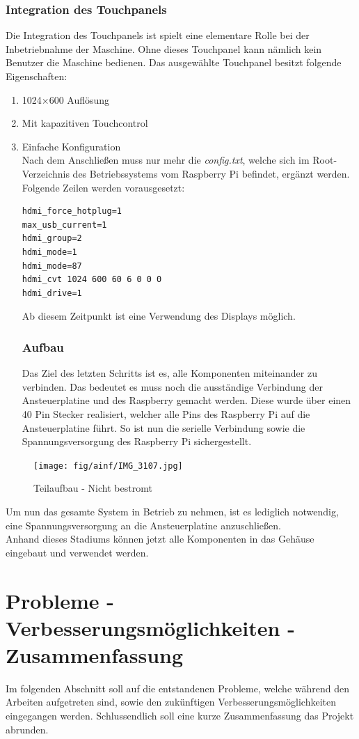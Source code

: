 \subsubsection{Integration des Touchpanels}
Die Integration des Touchpanels ist spielt eine elementare Rolle bei der Inbetriebnahme der Maschine.
Ohne dieses Touchpanel kann nämlich kein Benutzer die Maschine bedienen.
Das ausgewählte Touchpanel besitzt folgende Eigenschaften:
\begin{enumerate}
\item  1024×600 Auflösung
\item Mit kapazitiven Touchcontrol
\item Einfache Konfiguration\\
Nach dem Anschließen muss nur mehr die \textit{config.txt}, welche sich im Root-Verzeichnis des Betriebssystems vom Raspberry Pi befindet, ergänzt werden.
Folgende Zeilen werden vorausgesetzt:
\begin{lstlisting}[style=java,caption=Display-Parameter,label=resource]
hdmi_force_hotplug=1
max_usb_current=1
hdmi_group=2
hdmi_mode=1
hdmi_mode=87
hdmi_cvt 1024 600 60 6 0 0 0
hdmi_drive=1
\end{lstlisting}
Ab diesem Zeitpunkt ist eine Verwendung des Displays möglich.
\subsubsection{Aufbau}
Das Ziel des letzten Schritts ist es, alle Komponenten miteinander zu verbinden.
Das bedeutet es muss noch die ausständige Verbindung der Ansteuerplatine und des Raspberry gemacht werden.
Diese wurde über einen 40 Pin Stecker realisiert, welcher alle Pins des Raspberry Pi auf die Ansteuerplatine führt.
So ist nun die serielle Verbindung sowie die Spannungsversorgung des Raspberry Pi sichergestellt.
\end{enumerate}
\begin{figure}[H]
\centering
\texttt{[image: fig/ainf/IMG\_3107.jpg]}
\caption{Teilaufbau - Nicht bestromt}
\label{rpiAndDisplay}
\end{figure}
Um nun das gesamte System in Betrieb zu nehmen, ist es lediglich notwendig, eine Spannungsversorgung an die Ansteuerplatine anzuschließen.\\
Anhand dieses Stadiums können jetzt alle Komponenten in das Gehäuse eingebaut und verwendet werden.
\newpage
\section{Probleme - Verbesserungsmöglichkeiten - Zusammenfassung}
Im folgenden Abschnitt soll auf die entstandenen Probleme, welche während den Arbeiten aufgetreten sind, sowie den zukünftigen Verbesserungsmöglichkeiten eingegangen werden.
Schlussendlich soll eine kurze Zusammenfassung das Projekt abrunden.
